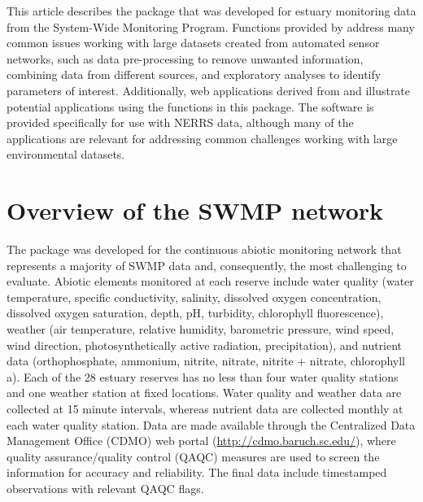 This article describes the  package that was developed for estuary monitoring data from the System-Wide Monitoring Program.  Functions provided by  address many common issues working with large datasets created from automated sensor networks, such as data pre-processing to remove unwanted information, combining data from different sources, and exploratory analyses to identify parameters of interest.  Additionally, web applications derived from  and  illustrate potential applications using the functions in this package.  The software is provided specifically for use with NERRS data, although many of the applications are relevant for addressing common challenges working with large environmental datasets.

\section{Overview of the SWMP network}

The  package was developed for the continuous abiotic monitoring network that represents a majority of SWMP data and, consequently, the most challenging to evaluate.  Abiotic elements monitored at each reserve include water quality (water temperature, specific conductivity, salinity, dissolved oxygen concentration, dissolved oxygen saturation, depth, pH, turbidity, chlorophyll fluorescence), weather (air temperature, relative humidity, barometric pressure, wind speed, wind direction, photosynthetically active radiation, precipitation), and nutrient data (orthophosphate, ammonium, nitrite, nitrate, nitrite + nitrate, chlorophyll a).  Each of the 28 estuary reserves has no less than four water quality stations and one weather station at fixed locations.  Water quality and weather data are collected at 15 minute intervals, whereas nutrient data are collected monthly at each water quality station.  Data are made available through the Centralized Data Management Office (CDMO) web portal (\url{http://cdmo.baruch.sc.edu/}), where quality assurance/quality control (QAQC) measures are used to screen the information for accuracy and reliability.  The final data include timestamped observations with relevant QAQC flags.

